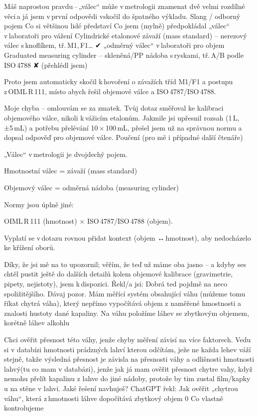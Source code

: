 Máš naprostou pravdu – „válec“ může v metrologii znamenat dvě velmi rozdílné věci a já jsem v první odpovědi vskočil do špatného výkladu.
Slang / odborný pojem	Co si většinou lidé představí	Co jsem (mylně) předpokládal
„válec“ v laboratoři pro vážení	Cylindrické etalonové závaží (mass standard) – nerezový válec s knoflíkem, tř. M1, F1…	✔
„odměrný válec“ v laboratoři pro objem	Graduated measuring cylinder – skleněná/PP nádoba s rys­kami, tř. A/B podle ISO 4788	✘ (přehlédl jsem)

Proto jsem automaticky skočil k hovoření o závažích tříd M1/F1 a postupu z OIML R 111, místo abych řešil objemové válce a ISO 4787/ISO 4788.

Moje chyba – omlouvám se za zmatek.
Tvůj dotaz směřoval ke kalibraci objemového válce, nikoli k vážicím etalonům. Jakmile jsi upřesnil rozsah (1 L, ±5 mL) a potřebu přelévání 10 × 100 mL, přešel jsem už na správnou normu a dopsal odpověď pro objemové válce.
Poučení (pro mě i případné další čtenáře)

    „Válec“ v metrologii je dvojdechý pojem.

        Hmotnostní válec = závaží (mass standard)

        Objemový válec = odměrná nádoba (measuring cylinder)

    Normy jsou úplně jiné:

        OIML R 111 (hmotnost) × ISO 4787/ISO 4788 (objem).

    Vyplatí se v dotazu rovnou přidat kontext (objem ↔ hmotnost), aby nedocházelo ke křížení oborů.

Díky, že jsi mě na to upozornil; věřím, že teď už máme oba jasno – a kdyby ses chtěl pustit ještě do dalších detailů kolem objemové kalibrace (gravimetrie, pipety, nejistoty), jsem k dispozici.
Řekl/a jsi:
Dobrá ted pojdmě na neco spoližitějšího. Dávaj pozor. Mám měřící systém obsahující váhu (můžeme tomu říkat chytrá váha), který nepřímo vypočítává objem z naměřené hmostnosti a znalosti hustoty dané kapaliny. Na váhu položíme láhev se zbytkovým objemem, korétně láhev alkohlu

Chci ověřit přesnost této váhy, jenže chyby měření závisí na více faktorech. Vedu si v databízi hmotnosti prádzných lahví kterou odčítám, ježe ne každa lehev váží stejně, takže výsledná přesnost je závisla na přesnosti váhy a odlišnosti hmotnosti lahvý(tu co mam v databázi), jenže jak já mam ověřit přesnost chytre vahy, když nemohu přelít kapalinu z lahve do jiné nádoby, protože by tim zustal film/kapky u na stěne v lahvi. Jaké řešení navhuješ?
ChatGPT řekl:
Jak ověřit „chytrou váhu“, která z hmotnosti láhve dopočítává zbytkový objem
0  Co vlastně kontrolujeme

